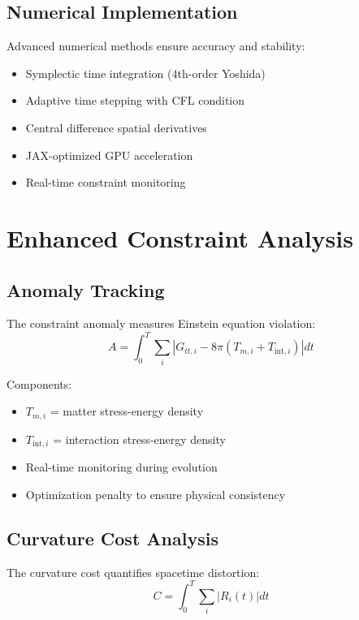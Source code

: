 \documentclass[11pt]{article}
\begin{document}
\subsection{Numerical Implementation}

Advanced numerical methods ensure accuracy and stability:
\begin{itemize}
\item Symplectic time integration (4th-order Yoshida)
\item Adaptive time stepping with CFL condition
\item Central difference spatial derivatives
\item JAX-optimized GPU acceleration
\item Real-time constraint monitoring
\end{itemize}

\section{Enhanced Constraint Analysis}

\subsection{Anomaly Tracking}

The constraint anomaly measures Einstein equation violation:
\begin{equation}
A = \int_0^T \sum_i |G_{tt,i} - 8\pi(T_{m,i} + T_{\text{int},i})| dt
\end{equation}

Components:
\begin{itemize}
\item $T_{m,i}$ = matter stress-energy density
\item $T_{\text{int},i}$ = interaction stress-energy density
\item Real-time monitoring during evolution
\item Optimization penalty to ensure physical consistency
\end{itemize}

\subsection{Curvature Cost Analysis}

The curvature cost quantifies spacetime distortion:
\begin{equation}
C = \int_0^T \sum_i |R_i(t)| dt
\end{equation}
\end{document}
